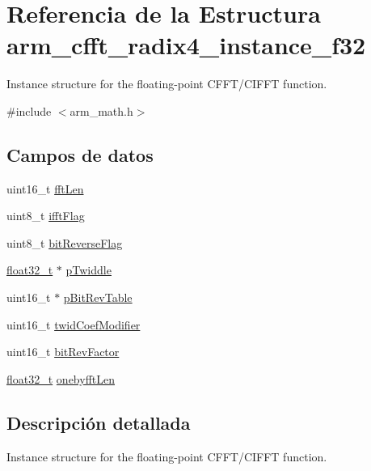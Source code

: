 \hypertarget{structarm__cfft__radix4__instance__f32}{}\section{Referencia de la Estructura arm\+\_\+cfft\+\_\+radix4\+\_\+instance\+\_\+f32}
\label{structarm__cfft__radix4__instance__f32}


Instance structure for the floating-\/point C\+F\+F\+T/\+C\+I\+F\+FT function.  




{\ttfamily \#include $<$arm\+\_\+math.\+h$>$}

\subsection*{Campos de datos}
\begin{DoxyCompactItemize}
\item 
uint16\+\_\+t \hyperlink{structarm__cfft__radix4__instance__f32_ab8db3bbe7c61e6bb8ca2a55e3446e11a}{fft\+Len}
\item 
uint8\+\_\+t \hyperlink{structarm__cfft__radix4__instance__f32_ad6ca6e223f986ebfd94c5ee1e410aa73}{ifft\+Flag}
\item 
uint8\+\_\+t \hyperlink{structarm__cfft__radix4__instance__f32_a09a221a818c6d0e064557a99e2fe9a8b}{bit\+Reverse\+Flag}
\item 
\hyperlink{arm__math_8h_a4611b605e45ab401f02cab15c5e38715}{float32\+\_\+t} $\ast$ \hyperlink{structarm__cfft__radix4__instance__f32_aca581481fccdff0f557f54a3ef20d967}{p\+Twiddle}
\item 
uint16\+\_\+t $\ast$ \hyperlink{structarm__cfft__radix4__instance__f32_a46a2fb328199897af100fea0bfdf59aa}{p\+Bit\+Rev\+Table}
\item 
uint16\+\_\+t \hyperlink{structarm__cfft__radix4__instance__f32_afe772e5b5001c9d8e85032115a8df5bf}{twid\+Coef\+Modifier}
\item 
uint16\+\_\+t \hyperlink{structarm__cfft__radix4__instance__f32_a33386d95319dc3ee7097b3a8e52e01ec}{bit\+Rev\+Factor}
\item 
\hyperlink{arm__math_8h_a4611b605e45ab401f02cab15c5e38715}{float32\+\_\+t} \hyperlink{structarm__cfft__radix4__instance__f32_acf295a7b97b7d48a9cae4d1ab5ed00f6}{onebyfft\+Len}
\end{DoxyCompactItemize}


\subsection{Descripción detallada}
Instance structure for the floating-\/point C\+F\+F\+T/\+C\+I\+F\+FT function. 

